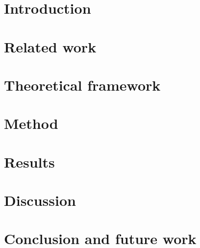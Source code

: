 \documentclass[a4paper,oneside]{bth}
\begin{document}
\tableofcontents

\cleardoublepage
\pagestyle{headings}


\chapter{Introduction}


\chapter{Related work}


\chapter{Theoretical framework}


\chapter{Method}


\chapter{Results}


\chapter{Discussion}


\chapter{Conclusion and future work}




\end{document}
